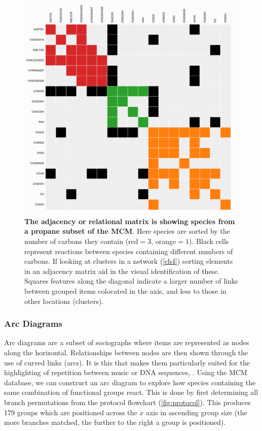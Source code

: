 \begin{figure}[H]
     \centering
     \includegraphics[width=.7\textwidth]{adjmatrix.png}
      \caption{\textbf{The adjacency or relational matrix is showing species from a propane subset of the MCM}. Here species are sorted by the number of carbons they contain (red$=3$, orange$=1$). Black cells represent reactions between species containing different numbers of carbons. If looking at clusters in a network (\autoref{ch4}) sorting elements in an adjacency matrix aid in the visual identification of these. Squares features along the diagonal indicate a larger number of links between grouped items colocated in the axis, and less to those in other locations (clusters).}
        \label{fig:adj}
\end{figure}

\subsubsection{Arc Diagrams}
Arc diagrams are a subset of sociographs where items are represented as nodes along the horizontal. Relationships between nodes are then shown through the use of curved links (arcs). It is this that makes them particularly suited for the highlighting of repetition between music or DNA sequences, \citep{arc}. Using the MCM database, we can construct an arc diagram to explore how species containing the same combination of functional groups react. This is done by first determining all branch permutations from the protocol flowchart (\autoref{fig:protocol}). This produces 179 groups which are positioned across the $x$ axis in ascending group size (the more branches matched, the further to the right a group is positioned).


